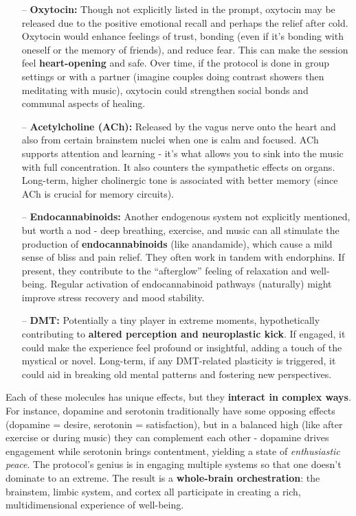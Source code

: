 \documentclass[11pt]{article}
\newcommand{\quotes}[1]{``#1''}
\begin{document}
\begin{itemize}
	\item[--] \textbf{Oxytocin:} Though not explicitly listed in the prompt, oxytocin may be released due to the positive emotional recall and perhaps the relief after cold. Oxytocin would enhance feelings of trust, bonding (even if it's bonding with oneself or the memory of friends), and reduce fear. This can make the session feel \textbf{heart-opening} and safe. Over time, if the protocol is done in group settings or with a partner (imagine couples doing contrast showers then meditating with music), oxytocin could strengthen social bonds and communal aspects of healing.
	 \item[--] \textbf{Acetylcholine (ACh):} Released by the vagus nerve onto the heart and also from certain brainstem nuclei when one is calm and focused. ACh supports attention and learning - it's what allows you to sink into the music with full concentration. It also counters the sympathetic effects on organs. Long-term, higher cholinergic tone is associated with better memory (since ACh is crucial for memory circuits).
	 \item[--] \textbf{Endocannabinoids:} Another endogenous system not explicitly mentioned, but worth a nod - deep breathing, exercise, and music can all stimulate the production of \textbf{endocannabinoids} (like anandamide), which cause a mild sense of bliss and pain relief. They often work in tandem with endorphins. If present, they contribute to the \quotes{afterglow} feeling of relaxation and well-being. Regular activation of endocannabinoid pathways (naturally) might improve stress recovery and mood stability.
	 \item[--] \textbf{DMT:} Potentially a tiny player in extreme moments, hypothetically contributing to \textbf{altered perception and neuroplastic kick}. If engaged, it could make the experience feel profound or insightful, adding a touch of the mystical or novel. Long-term, if any DMT-related plasticity is triggered, it could aid in breaking old mental patterns and fostering new perspectives.
\end{itemize}

Each of these molecules has unique effects, but they \textbf{interact in complex ways}. For instance, dopamine and serotonin traditionally have some opposing effects (dopamine = desire, serotonin = satisfaction), but in a balanced high (like after exercise or during music) they can complement each other - dopamine drives engagement while serotonin brings contentment, yielding a state of \textit{enthusiastic peace}. The protocol's genius is in engaging multiple systems so that one doesn't dominate to an extreme. The result is a \textbf{whole-brain orchestration}: the brainstem, limbic system, and cortex all participate in creating a rich, multidimensional experience of well-being.
\end{document}
